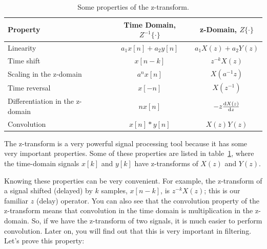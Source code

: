 \begin{table}
\caption{Some properties of the z-transform.\label{tb:zt-property}}
\begin{center}
\begin{tabular}{|l|c|c|} \hline
Property      & Time Domain, $Z^{-1}\{\cdot\}$ & z-Domain, $Z\{\cdot\}$ \\ \hline\hline
Linearity     & $a_1x[n]+a_2y[n]$ & $a_1X(z)+a_2Y(z)$\\ 
Time shift    & $x[n-k]$       & $z^{-k}X(z)$\\ 
Scaling in the z-domain 
              & $a^nx[n]$        & $X(a^{-1}z)$ \\ 
Time reversal & $x[-n]$        & $X(z^{-1})$\\ 
Differentiation in the z-domain 
              & $nx[n]$          & $-z \frac{\mathrm{d} X(z)}{\mathrm{d} z}$ \\ 
Convolution   & $x[n] \ast y[n]$       & $X(z)Y(z)$ \\ \hline
\end{tabular}
\end{center}
\end{table}

The z-transform is a very powerful signal processing tool because it
has some very important properties. Some of these properties are
listed in
table~\ref{tb:zt-property}, where the time-domain signals $x[k]$
and $y[k]$ have z-transforms of $X(z)$ and $Y(z)$.

Knowing these properties can be very convenient. For example, the
z-transform of a signal shifted (delayed) by $k$ samples, $x[n-k]$,
is $z^{-k}X(z)$; this is our familiar $z$ (delay) operator. You can
also see that the convolution property of the z-transform means that
convolution in the time domain is multiplication in the z-domain. So,
if we have the z-transform of two signals, it is much easier to
perform convolution.  Later on, you will find out that this is very
important in filtering. Let's prove this property:

